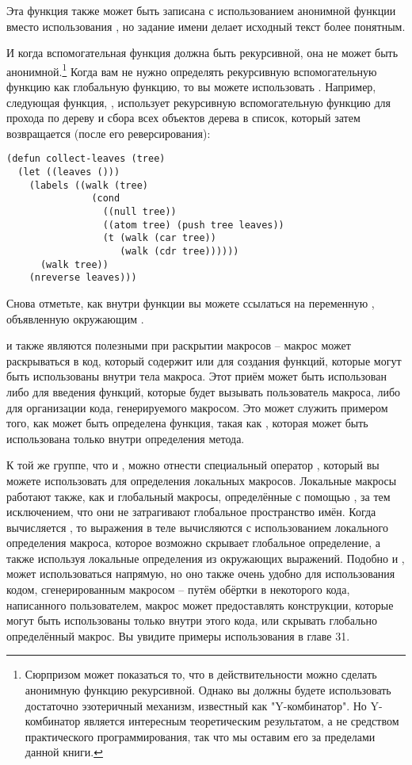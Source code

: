 Эта функция также может быть записана с использованием анонимной функции вместо
использования , но задание имени делает исходный текст более понятным.

И когда вспомогательная функция должна быть рекурсивной, она не может быть
анонимной.\footnote{Сюрпризом может показаться то, что в действительности можно сделать
  анонимную функцию рекурсивной.  Однако вы должны будете использовать достаточно
  эзотеричный механизм, известный как "Y-комбинатор".  Но Y-комбинатор является интересным
  теоретическим результатом, а не средством практического программирования, так что мы
  оставим его за пределами данной книги.}  Когда вам не нужно определять рекурсивную
вспомогательную функцию как глобальную функцию, то вы можете использовать .
Например, следующая функция, , использует рекурсивную вспомогательную
функцию  для прохода по дереву и сбора всех объектов дерева в список, который
затем возвращается  (после его реверсирования):

\begin{lstlisting}
(defun collect-leaves (tree)
  (let ((leaves ()))
    (labels ((walk (tree)
               (cond
                 ((null tree))
                 ((atom tree) (push tree leaves))
                 (t (walk (car tree))
                    (walk (cdr tree))))))
      (walk tree))
    (nreverse leaves)))
\end{lstlisting}


Снова отметьте, как внутри функции  вы можете ссылаться на переменную
, объявленную окружающим .

 и  также являются полезными при раскрытии макросов -- макрос
может раскрываться в код, который содержит  или  для создания
функций, которые могут быть использованы внутри тела макроса.  Этот приём может быть
использован либо для введения функций, которые будет вызывать пользователь макроса, либо
для организации кода, генерируемого макросом.  Это может служить примером того, как может
быть определена функция, такая как , которая может быть
использована только внутри определения метода.

К той же группе, что  и , можно отнести специальный оператор
, который вы можете использовать для определения локальных
макросов. Локальные макросы работают также, как и глобальный макросы, определённые с
помощью , за тем исключением, что они не затрагивают глобальное
пространство имён.  Когда вычисляется , то выражения в теле вычисляются с
использованием локального определения макроса, которое возможно скрывает глобальное
определение, а также используя локальные определения из окружающих выражений.  Подобно
 и ,  может использоваться напрямую, но оно также
очень удобно для использования кодом, сгенерированным макросом -- путём обёртки в
 некоторого кода, написанного пользователем, макрос может предоставлять
конструкции, которые могут быть использованы только внутри этого кода, или скрывать
глобально определённый макрос.  Вы увидите примеры использования  в главе
31.

